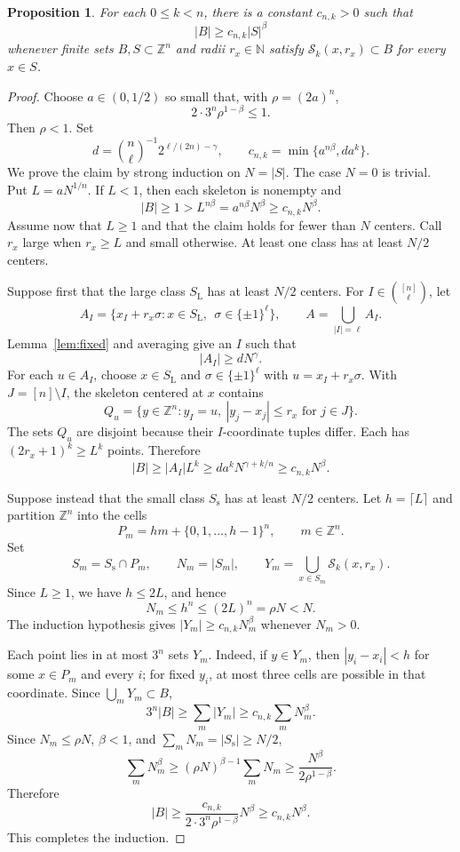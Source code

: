 \documentclass[10pt,a4paper]{amsart}
\newtheorem{proposition}{Proposition}
\newcommand{\N}{\mathbb{N}}
\newcommand{\Z}{\mathbb{Z}}
\newcommand{\cS}{\mathcal{S}}
\begin{document}
\begin{proposition}\label{prop:lower}
For each $0\leq k<n$, there is a constant $c_{n,k}>0$ such that
\[
 |B|\geq c_{n,k}|S|^\beta
\]
whenever finite sets $B,S\subset\Z^n$ and radii $r_x\in\N$ satisfy
$\cS_k(x,r_x)\subset B$ for every $x\in S$.
\end{proposition}

\begin{proof}
Choose $a\in(0,1/2)$ so small that, with $\rho=(2a)^n$,
\[
 2\cdot3^n\rho^{1-\beta}\leq1.
\]
Then $\rho<1$.  Set
\[
 d=\binom{n}{\ell}^{-1}2^{\ell/(2n)-\gamma},
 \qquad
 c_{n,k}=\min\{a^{n\beta},da^k\}.
\]
We prove the claim by strong induction on $N=|S|$.  The case $N=0$ is
trivial.
Put $L=aN^{1/n}$.  If $L<1$, then each skeleton is nonempty and
\[
 |B|\geq1>L^{n\beta}=a^{n\beta}N^\beta\geq c_{n,k}N^\beta.
\]
Assume now that $L\geq1$ and that the claim holds for fewer than $N$ centers.
Call $r_x$ large when $r_x\geq L$ and small otherwise.  At least one class has
at least $N/2$ centers.

Suppose first that the large class $S_{\mathrm L}$ has at least $N/2$ centers.
For $I\in\binom{[n]}{\ell}$, let
\[
 A_I=\{x_I+r_x\sigma:x\in S_{\mathrm L},\
       \ \sigma\in\{\pm1\}^\ell\},
 \qquad
 A=\bigcup_{|I|=\ell}A_I.
\]
Lemma~\ref{lem:fixed} and averaging give an $I$ such that
\[
 |A_I|\geq dN^\gamma.
\]
For each $u\in A_I$, choose $x\in S_{\mathrm L}$ and
$\sigma\in\{\pm1\}^\ell$ with $u=x_I+r_x\sigma$.  With
$J=[n]\setminus I$, the skeleton centered at $x$ contains
\[
 Q_u=\{y\in\Z^n:y_I=u,\ |y_j-x_j|\leq r_x\text{ for }j\in J\}.
\]
The sets $Q_u$ are disjoint because their $I$-coordinate tuples differ.  Each
has $(2r_x+1)^k\geq L^k$ points.  Therefore
\[
 |B|\geq |A_I|L^k
 \geq da^kN^{\gamma+k/n}
 \geq c_{n,k}N^\beta.
\]

Suppose instead that the small class $S_{\mathrm s}$ has at least $N/2$
centers.  Let $h=\lceil L\rceil$ and partition $\Z^n$ into the cells
\[
 P_m=hm+\{0,1,\ldots,h-1\}^n,
 \qquad m\in\Z^n.
\]
Set
\[
 S_m=S_{\mathrm s}\cap P_m,
 \qquad
 N_m=|S_m|,
 \qquad
 Y_m=\bigcup_{x\in S_m}\cS_k(x,r_x).
\]
Since $L\geq1$, we have $h\leq2L$, and hence
\[
 N_m\leq h^n\leq(2L)^n=\rho N<N.
\]
The induction hypothesis gives $|Y_m|\geq c_{n,k}N_m^\beta$ whenever
$N_m>0$.

Each point lies in at most $3^n$ sets $Y_m$.  Indeed, if $y\in Y_m$, then
$|y_i-x_i|<h$ for some $x\in P_m$ and every $i$; for fixed $y_i$, at most
three cells are possible in that coordinate.  Since $\bigcup_m Y_m\subset B$,
\[
 3^n|B|\geq\sum_m |Y_m|
 \geq c_{n,k}\sum_m N_m^\beta.
\]
Since $N_m\leq\rho N$, $\beta<1$, and
$\sum_m N_m=|S_{\mathrm s}|\geq N/2$,
\[
 \sum_m N_m^\beta
 \geq(\rho N)^{\beta-1}\sum_m N_m
 \geq\frac{N^\beta}{2\rho^{1-\beta}}.
\]
Therefore
\[
 |B|\geq
 \frac{c_{n,k}}{2\cdot3^n\rho^{1-\beta}}N^\beta
 \geq c_{n,k}N^\beta.
\]
This completes the induction.
\end{proof}
\end{document}
